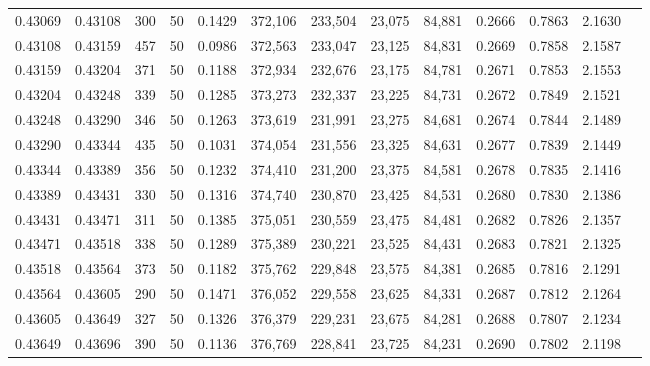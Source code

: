 \begin{tabular}{rrrrrrrrrrrrr}
0.43069 & 0.43108 &   300 &  50 &                                     0.1429 & 372,106 & 233,504 &  23,075 &  84,881 & 0.2666 & 0.7863 & 2.1630 \\
0.43108 & 0.43159 &   457 &  50 &                                     0.0986 & 372,563 & 233,047 &  23,125 &  84,831 & 0.2669 & 0.7858 & 2.1587 \\
0.43159 & 0.43204 &   371 &  50 &                                     0.1188 & 372,934 & 232,676 &  23,175 &  84,781 & 0.2671 & 0.7853 & 2.1553 \\
0.43204 & 0.43248 &   339 &  50 &                                     0.1285 & 373,273 & 232,337 &  23,225 &  84,731 & 0.2672 & 0.7849 & 2.1521 \\
0.43248 & 0.43290 &   346 &  50 &                                     0.1263 & 373,619 & 231,991 &  23,275 &  84,681 & 0.2674 & 0.7844 & 2.1489 \\
0.43290 & 0.43344 &   435 &  50 &                                     0.1031 & 374,054 & 231,556 &  23,325 &  84,631 & 0.2677 & 0.7839 & 2.1449 \\
0.43344 & 0.43389 &   356 &  50 &                                     0.1232 & 374,410 & 231,200 &  23,375 &  84,581 & 0.2678 & 0.7835 & 2.1416 \\
0.43389 & 0.43431 &   330 &  50 &                                     0.1316 & 374,740 & 230,870 &  23,425 &  84,531 & 0.2680 & 0.7830 & 2.1386 \\
0.43431 & 0.43471 &   311 &  50 &                                     0.1385 & 375,051 & 230,559 &  23,475 &  84,481 & 0.2682 & 0.7826 & 2.1357 \\
0.43471 & 0.43518 &   338 &  50 &                                     0.1289 & 375,389 & 230,221 &  23,525 &  84,431 & 0.2683 & 0.7821 & 2.1325 \\
0.43518 & 0.43564 &   373 &  50 &                                     0.1182 & 375,762 & 229,848 &  23,575 &  84,381 & 0.2685 & 0.7816 & 2.1291 \\
0.43564 & 0.43605 &   290 &  50 &                                     0.1471 & 376,052 & 229,558 &  23,625 &  84,331 & 0.2687 & 0.7812 & 2.1264 \\
0.43605 & 0.43649 &   327 &  50 &                                     0.1326 & 376,379 & 229,231 &  23,675 &  84,281 & 0.2688 & 0.7807 & 2.1234 \\
0.43649 & 0.43696 &   390 &  50 &                                     0.1136 & 376,769 & 228,841 &  23,725 &  84,231 & 0.2690 & 0.7802 & 2.1198 \\

\end{tabular}
